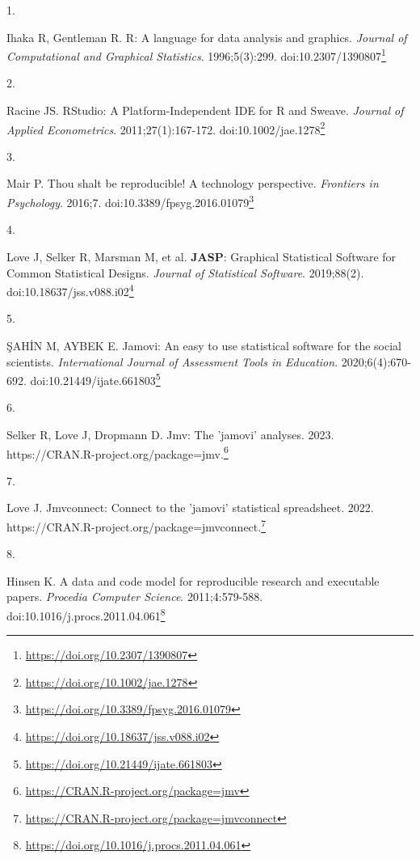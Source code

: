 \documentclass[
  a4paper,
]{book}
\newlength{\cslhangindent}
\newlength{\csllabelwidth}
\newlength{\cslentryspacingunit} %
\newenvironment{CSLReferences}[2] %
 {%
  \setlength{\parindent}{0pt}
  \ifodd #1
  \let\oldpar\par
  \def\par{\hangindent=\cslhangindent\oldpar}
  \fi
  \setlength{\parskip}{#2\cslentryspacingunit}
 }%
 {}
\newcommand{\CSLLeftMargin}[1]{\parbox[t]{\csllabelwidth}{#1}}
\newcommand{\CSLRightInline}[1]{\parbox[t]{\linewidth - \csllabelwidth}{#1}\break}
\renewcommand{\href}[2]{#2\footnote{\url{#1}}}
\begin{document}
\hypertarget{refs}{}
\begin{CSLReferences}{0}{0}
\leavevmode{}%
\CSLLeftMargin{1. }%
\CSLRightInline{Ihaka R, Gentleman R. R: A language for data analysis and graphics. \emph{Journal of Computational and Graphical Statistics}. 1996;5(3):299. doi:\href{https://doi.org/10.2307/1390807}{10.2307/1390807}}

\leavevmode{}%
\CSLLeftMargin{2. }%
\CSLRightInline{Racine JS. RStudio: A Platform{-}Independent IDE for R and Sweave. \emph{Journal of Applied Econometrics}. 2011;27(1):167-172. doi:\href{https://doi.org/10.1002/jae.1278}{10.1002/jae.1278}}

\leavevmode{}%
\CSLLeftMargin{3. }%
\CSLRightInline{Mair P. Thou shalt be reproducible! A technology perspective. \emph{Frontiers in Psychology}. 2016;7. doi:\href{https://doi.org/10.3389/fpsyg.2016.01079}{10.3389/fpsyg.2016.01079}}

\leavevmode{}%
\CSLLeftMargin{4. }%
\CSLRightInline{Love J, Selker R, Marsman M, et al. {\textbf{JASP}}: Graphical Statistical Software for Common Statistical Designs. \emph{Journal of Statistical Software}. 2019;88(2). doi:\href{https://doi.org/10.18637/jss.v088.i02}{10.18637/jss.v088.i02}}

\leavevmode{}%
\CSLLeftMargin{5. }%
\CSLRightInline{ŞAHİN M, AYBEK E. Jamovi: An easy to use statistical software for the social scientists. \emph{International Journal of Assessment Tools in Education}. 2020;6(4):670-692. doi:\href{https://doi.org/10.21449/ijate.661803}{10.21449/ijate.661803}}

\leavevmode{}%
\CSLLeftMargin{6. }%
\CSLRightInline{Selker R, Love J, Dropmann D. Jmv: The 'jamovi' analyses. 2023. \href{https://CRAN.R-project.org/package=jmv}{https://CRAN.R-project.org/package=jmv.}}

\leavevmode{}%
\CSLLeftMargin{7. }%
\CSLRightInline{Love J. Jmvconnect: Connect to the 'jamovi' statistical spreadsheet. 2022. \href{https://CRAN.R-project.org/package=jmvconnect}{https://CRAN.R-project.org/package=jmvconnect.}}

\leavevmode{}%
\CSLLeftMargin{8. }%
\CSLRightInline{Hinsen K. A data and code model for reproducible research and executable papers. \emph{Procedia Computer Science}. 2011;4:579-588. doi:\href{https://doi.org/10.1016/j.procs.2011.04.061}{10.1016/j.procs.2011.04.061}}


\end{CSLReferences}
\end{document}
